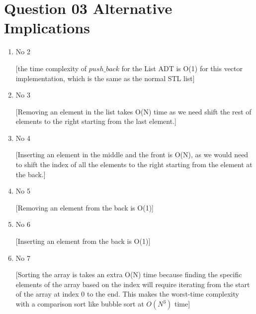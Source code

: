 \documentclass{article}
\begin{document}
\section{Question 03 Alternative Implications}
\begin{enumerate}[label=(\arabic*)]

\item No 2

[the time complexity of $push\_back$ for the List ADT is O(1) for this vector implementation, which is the same as the normal STL list]

\item No 3

[Removing an element in the list takes O(N) time as we need shift the rest of elements to the right starting from the last element.]

\item No 4

[Inserting an element in the middle and the front is O(N), as we would need to shift the index of all the elements to the right starting from the element at the back.]

\item No 5

[Removing an element from the back is O(1)]

\item No 6

[Inserting an element from the back is O(1)]

\item No 7

[Sorting the array is takes an extra O(N) time because finding the specific elements of the array based on the index will require iterating from the start of the array at index 0 to the end. This makes the worst-time complexity with a comparison sort like bubble sort at $O(N^3)$ time]

\end{enumerate}
\end{document}

